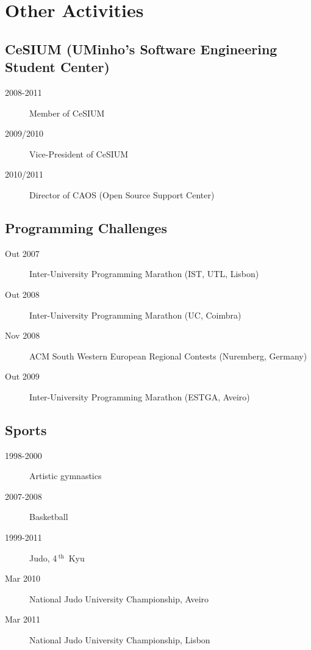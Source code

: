 \documentclass{article}
\begin{document}
\section{Other Activities}

\subsection{CeSIUM (UMinho's Software Engineering Student Center)}
\begin{description}
	\item [2008-2011] Member of CeSIUM 
	\item [2009/2010] Vice-President of CeSIUM 
	\item [2010/2011] Director of CAOS (Open Source Support Center)
\end{description}
\subsection{Programming Challenges}
\begin{description}
	\item [Out 2007] Inter-University Programming Marathon (IST, UTL, Lisbon)
	\item [Out 2008] Inter-University Programming Marathon (UC, Coimbra)
	\item [Nov 2008] ACM South Western European Regional Contests (Nuremberg, Germany)
	\item [Out 2009] Inter-University Programming Marathon (ESTGA, Aveiro)
\end{description}
\subsection{Sports}
\begin{description}
	\item [1998-2000] Artistic gymnastics
	\item [2007-2008] Basketball
	\item [1999-2011] Judo, 4$\,^{\textrm{th}}$~Kyu
	\item [Mar 2010] National Judo University Championship, Aveiro
	\item [Mar 2011] National Judo University Championship, Lisbon
\end{description}

\renewcommand{\refname}{\section{Publications}}


\nocite{*}
\end{document}
